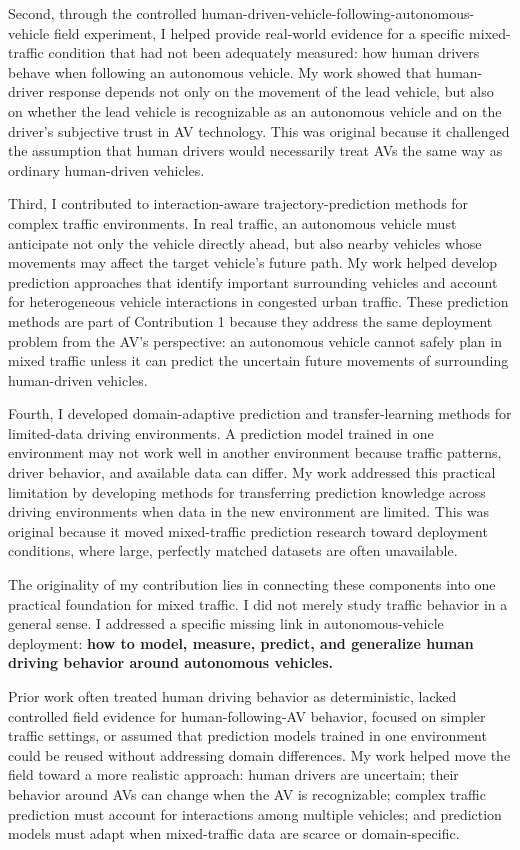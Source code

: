 \documentclass[11pt,letterpaper]{article}
\begin{document}
Second, through the controlled human-driven-vehicle-following-autonomous-vehicle field experiment, I helped provide real-world evidence for a specific mixed-traffic condition that had not been adequately measured: how human drivers behave when following an autonomous vehicle. My work showed that human-driver response depends not only on the movement of the lead vehicle, but also on whether the lead vehicle is recognizable as an autonomous vehicle and on the driver's subjective trust in AV technology. This was original because it challenged the assumption that human drivers would necessarily treat AVs the same way as ordinary human-driven vehicles.

Third, I contributed to interaction-aware trajectory-prediction methods for complex traffic environments. In real traffic, an autonomous vehicle must anticipate not only the vehicle directly ahead, but also nearby vehicles whose movements may affect the target vehicle's future path. My work helped develop prediction approaches that identify important surrounding vehicles and account for heterogeneous vehicle interactions in congested urban traffic. These prediction methods are part of Contribution 1 because they address the same deployment problem from the AV's perspective: an autonomous vehicle cannot safely plan in mixed traffic unless it can predict the uncertain future movements of surrounding human-driven vehicles.

Fourth, I developed domain-adaptive prediction and transfer-learning methods for limited-data driving environments. A prediction model trained in one environment may not work well in another environment because traffic patterns, driver behavior, and available data can differ. My work addressed this practical limitation by developing methods for transferring prediction knowledge across driving environments when data in the new environment are limited. This was original because it moved mixed-traffic prediction research toward deployment conditions, where large, perfectly matched datasets are often unavailable.

The originality of my contribution lies in connecting these components into one practical foundation for mixed traffic. I did not merely study traffic behavior in a general sense. I addressed a specific missing link in autonomous-vehicle deployment: \textbf{how to model, measure, predict, and generalize human driving behavior around autonomous vehicles.}

Prior work often treated human driving behavior as deterministic, lacked controlled field evidence for human-following-AV behavior, focused on simpler traffic settings, or assumed that prediction models trained in one environment could be reused without addressing domain differences. My work helped move the field toward a more realistic approach: human drivers are uncertain; their behavior around AVs can change when the AV is recognizable; complex traffic prediction must account for interactions among multiple vehicles; and prediction models must adapt when mixed-traffic data are scarce or domain-specific.
\end{document}

